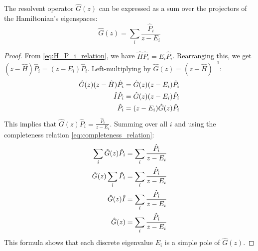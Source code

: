 \begin{proposition}
    The resolvent operator $\hat G(z)$ can be expressed as a sum over
    the projectors of the Hamiltonian's eigenspaces:
    \begin{equation} \label{eq:resolvent_spectral_decomposition}
        \hat G(z) = \sum_i \frac{\hat P_i}{z - E_i}
    \end{equation}
\end{proposition}
\begin{proof}
    From \eqref{eq:H_P_i_relation}, we have $\hat H \hat P_i = E_i \hat P_i$.
    Rearranging this, we get $(z - \hat H) \hat P_i = (z - E_i) \hat P_i$.
    Left-multiplying by $\hat G(z) = (z - \hat H)^{-1}$:
    \begin{align} \label{eq:resolvent_derivation}
        \hat G(z) (z - \hat H) \hat P_i &= \hat G(z) (z - E_i) \hat P_i \\
        \hat I \hat P_i &= \hat G(z) (z - E_i) \hat P_i \notag \\
        \hat P_i &= (z - E_i) \hat G(z) \hat P_i \notag
    \end{align}
    This implies that $\hat G(z) \hat P_i = \frac{\hat P_i}{z - E_i}$.
    Summing over all $i$ and using the completeness relation
    \eqref{eq:completeness_relation}:
    \begin{align}
        \sum_i \hat G(z) \hat P_i &= \sum_i \frac{\hat P_i}{z - E_i} \\
        \hat G(z) \sum_i \hat P_i &= \sum_i \frac{\hat P_i}{z - E_i} \notag \\
        \hat G(z) \hat I &= \sum_i \frac{\hat P_i}{z - E_i} \notag \\
        \hat G(z) &= \sum_i \frac{\hat P_i}{z - E_i} \notag
    \end{align}
    This formula shows that each discrete eigenvalue $E_i$ is a
    simple pole of $\hat G(z)$.
\end{proof}

